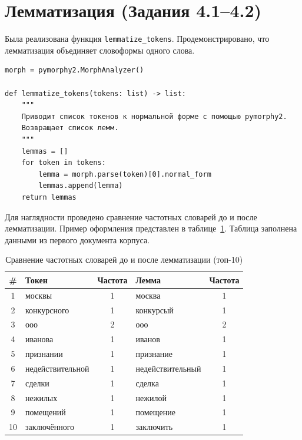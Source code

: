 \documentclass[12pt, a4paper]{report}
\begin{document}
\section{Лемматизация (Задания 4.1–4.2)}

Была реализована функция \texttt{lemmatize\_tokens}. Продемонстрировано, что
лемматизация объединяет словоформы одного слова.

\begin{lstlisting}[caption={Реализация функции лемматизации}, label={lst:lemmatization}]
morph = pymorphy2.MorphAnalyzer()

def lemmatize_tokens(tokens: list) -> list:
    """
    Приводит список токенов к нормальной форме с помощью pymorphy2.
    Возвращает список лемм.
    """
    lemmas = []
    for token in tokens:
        lemma = morph.parse(token)[0].normal_form
        lemmas.append(lemma)
    return lemmas
\end{lstlisting}

Для наглядности проведено сравнение частотных словарей до и после лемматизации. Пример оформления
представлен в таблице~\ref{tab:lemma_compare}. Таблица заполнена данными из первого документа корпуса.

\begin{table}[h]
  \centering
  \caption{Сравнение частотных словарей до и после лемматизации (топ-10)}
  \label{tab:lemma_compare}
  \begin{tabularx}{0.9\textwidth}{c X c X c}
    \toprule
    \rowcolor{LightBlue}
    \textsf{\textbf{\#}} &
    \textsf{\textbf{Токен}} &
    \textsf{\textbf{Частота}} &
    \textsf{\textbf{Лемма}} &
    \textsf{\textbf{Частота}} \\
    \midrule
    1  & москвы & 1 & москва & 1 \\
    2  & конкурсного & 1 & конкурсый & 1 \\
    3  & ооо & 2 & ооо & 2 \\
    4  & иванова & 1 & иванов & 1 \\
    5  & признании & 1 & признание & 1 \\
    6  & недействительной & 1 & недействительный & 1 \\
    7  & сделки & 1 & сделка & 1 \\
    8  & нежилых & 1 & нежилой & 1 \\
    9  & помещений & 1 & помещение & 1 \\
    10 & заключённого & 1 & заключить & 1 \\
    \bottomrule
  \end{tabularx}
\end{table}
\end{document}
